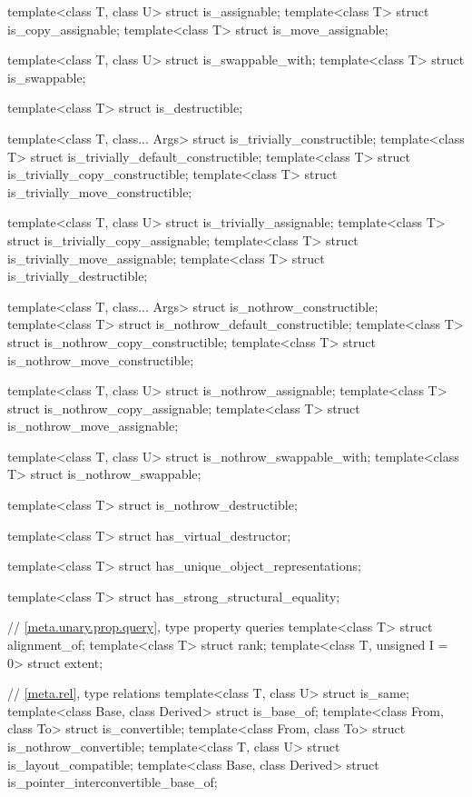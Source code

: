 \begin{codeblock}
{  template<class T, class U> struct is_assignable;
  template<class T> struct is_copy_assignable;
  template<class T> struct is_move_assignable;

  template<class T, class U> struct is_swappable_with;
  template<class T> struct is_swappable;

  template<class T> struct is_destructible;

  template<class T, class... Args> struct is_trivially_constructible;
  template<class T> struct is_trivially_default_constructible;
  template<class T> struct is_trivially_copy_constructible;
  template<class T> struct is_trivially_move_constructible;

  template<class T, class U> struct is_trivially_assignable;
  template<class T> struct is_trivially_copy_assignable;
  template<class T> struct is_trivially_move_assignable;
  template<class T> struct is_trivially_destructible;

  template<class T, class... Args> struct is_nothrow_constructible;
  template<class T> struct is_nothrow_default_constructible;
  template<class T> struct is_nothrow_copy_constructible;
  template<class T> struct is_nothrow_move_constructible;

  template<class T, class U> struct is_nothrow_assignable;
  template<class T> struct is_nothrow_copy_assignable;
  template<class T> struct is_nothrow_move_assignable;

  template<class T, class U> struct is_nothrow_swappable_with;
  template<class T> struct is_nothrow_swappable;

  template<class T> struct is_nothrow_destructible;

  template<class T> struct has_virtual_destructor;

  template<class T> struct has_unique_object_representations;

  template<class T> struct has_strong_structural_equality;

  // \ref{meta.unary.prop.query}, type property queries
  template<class T> struct alignment_of;
  template<class T> struct rank;
  template<class T, unsigned I = 0> struct extent;

  // \ref{meta.rel}, type relations
  template<class T, class U> struct is_same;
  template<class Base, class Derived> struct is_base_of;
  template<class From, class To> struct is_convertible;
  template<class From, class To> struct is_nothrow_convertible;
  template<class T, class U> struct is_layout_compatible;
  template<class Base, class Derived> struct is_pointer_interconvertible_base_of;

}
\end{codeblock}
